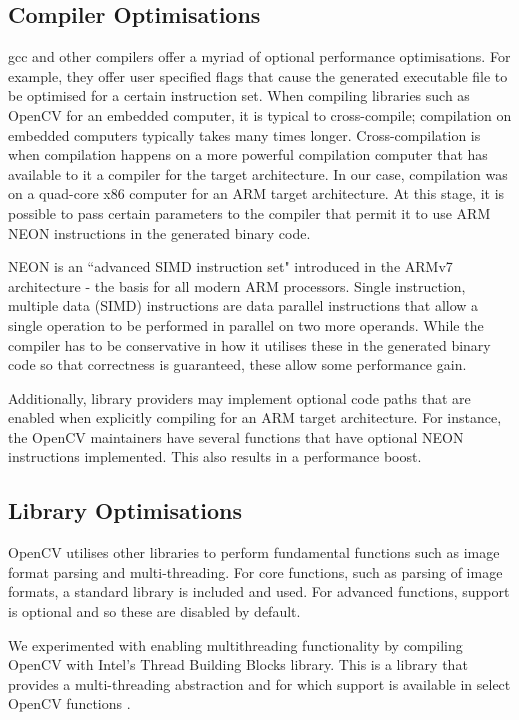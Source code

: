 \documentclass{acm_proc_article-sp}
\begin{document}
\subsection{Compiler Optimisations}
gcc and other compilers offer a myriad of optional performance optimisations. For example, they offer user specified flags that cause the generated executable file to be optimised for a certain instruction set. When compiling libraries such as OpenCV for an embedded computer, it is typical to cross-compile; compilation on embedded computers typically takes many times longer. Cross-compilation is when compilation happens on a more powerful compilation computer that has available to it a compiler for the target architecture. In our case, compilation was on a quad-core x86 computer for an ARM target architecture. At this stage, it is possible to pass certain parameters to the compiler that permit it to use ARM NEON instructions in the generated binary code.

NEON is an ``advanced SIMD instruction set" introduced in the ARMv7 architecture - the basis for all modern ARM processors. Single instruction, multiple data (SIMD) instructions are data parallel instructions that allow a single operation to be performed in parallel on two more operands. While the compiler has to be conservative in how it utilises these in the generated binary code so that correctness is guaranteed, these allow some performance gain.

Additionally, library providers may implement optional code paths that are enabled when explicitly compiling for an ARM target architecture. For instance, the OpenCV maintainers have several functions that have optional NEON instructions implemented. This also results in a performance boost.

\subsection{Library Optimisations}
OpenCV utilises other libraries to perform fundamental functions such as image format parsing and multi-threading. For core functions, such as parsing of image formats, a standard library is included and used. For advanced functions, support is optional and so these are disabled by default. 

We experimented with enabling multithreading functionality by compiling OpenCV with Intel's Thread Building Blocks library. This is a library that provides a multi-threading abstraction and for which support is available in select OpenCV functions \cite{opencvtbb}.
\end{document}
